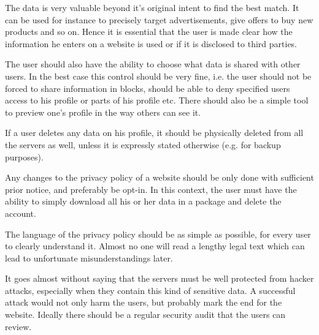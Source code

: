 \documentclass[12pt,oneside]{fithesis}
\begin{document}
	The data is very valuable beyond it's original intent to find the best match. It can be used for instance to precisely target advertisements, give offers to buy new products and so on. Hence it is essential that the user is made clear how the information he enters on a website is used or if it is disclosed to third parties.
	
	The user should also have the ability to choose what data is shared with other users. In the best case this control should be very fine, i.e. the user should not be forced to share information in blocks, should be able to deny specified users access to his profile or parts of his profile etc. There should also be a simple tool to preview one's profile in the way others can see it.
	
	If a user deletes any data on his profile, it should be physically deleted from all the servers as well, unless it is expressly stated otherwise (e.g. for backup purposes).
	
	Any changes to the privacy policy of a website should be only done with sufficient prior notice, and preferably be opt-in. In this context, the user must have the ability to simply download all his or her data in a package and delete the account.
	
	The language of the privacy policy should be as simple as possible, for every user to clearly understand it. Almost no one will read a lengthy legal text which can lead to unfortunate misunderstandings later.
	
	It goes almost without saying that the servers must be well protected from hacker attacks, especially when they contain this kind of sensitive data. A successful attack would not only harm the users, but probably mark the end for the website. Ideally there should be a regular security audit that the users can review.
\end{document}
